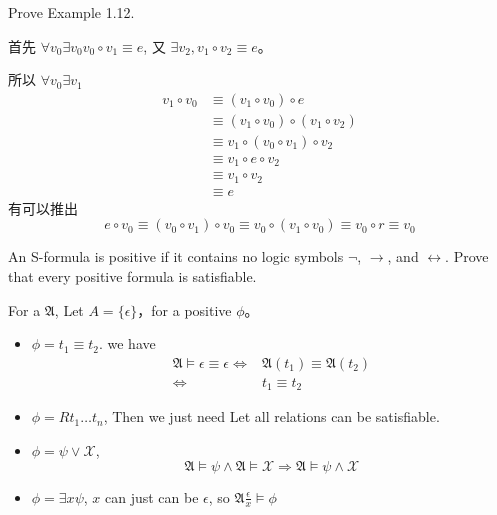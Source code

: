\documentclass{ximera}
\begin{document}
\begin{problem} Prove Example 1.12.
    \begin{solution}
    
       首先 $ \forall v_0\exists v_0 v_0 \circ v_1 \equiv e $,
       又 $\exists v_2, v_1 \circ v_2 \equiv e$。

       所以  $\forall v_0\exists v_1$
       $$
       \begin{aligned}  
            v_1 \circ v_0 
            &\equiv (v_1 \circ v_0) \circ e \\
            &\equiv (v_1 \circ v_0) \circ (v_1 \circ v_2) \\
            &\equiv v_1 \circ (v_0 \circ v_1) \circ v_2 \\
            &\equiv v_1 \circ e \circ v_2 \\
            &\equiv  v_1 \circ v_2 \\
            &\equiv e
       \end{aligned}
       $$
       有可以推出
       $$e\circ v_0 \equiv (v_0 \circ v_1) \circ v_0 \equiv v_0 \circ (v_1 \circ v_0) \equiv v_0 \circ r \equiv v_0$$
    \end{solution}
\end{problem}

\begin{problem} An S-formula is positive if it contains no logic symbols $\neg$, $\rightarrow$, and $\leftrightarrow$. Prove that
    every positive formula is satisfiable.
    \begin{solution}
        For a $\mathfrak{A}$, Let $A = \{\epsilon\}$，for a positive $\phi$。
        \begin{itemize}
            \item $\phi = t_1 \equiv t_2$. we have 
                $$
                \begin{aligned}
                    \mathfrak{A} \models \epsilon \equiv \epsilon \Leftrightarrow& 
                                \mathfrak{A}(t_1) \equiv \mathfrak{A}(t_2) \\
                                \Leftrightarrow& t_1 \equiv t_2
                \end{aligned}
                $$
            \item $\phi = Rt_1\dots t_n$, Then we just need Let all relations can be satisfiable.
            \item $\phi = \psi \lor \mathcal{X}$, 
            $$
                \mathfrak{A} \models \psi \land \mathfrak{A} \models \mathcal{X} \Rightarrow \mathfrak{A} \models \psi \land \mathcal{X}
            $$
            \item $\phi = \exists x \psi$, $x$ can just can be $\epsilon$, so $\mathfrak{A}\frac \epsilon x \models \phi$
        \end{itemize}
    \end{solution}
\end{problem}
\end{document}
